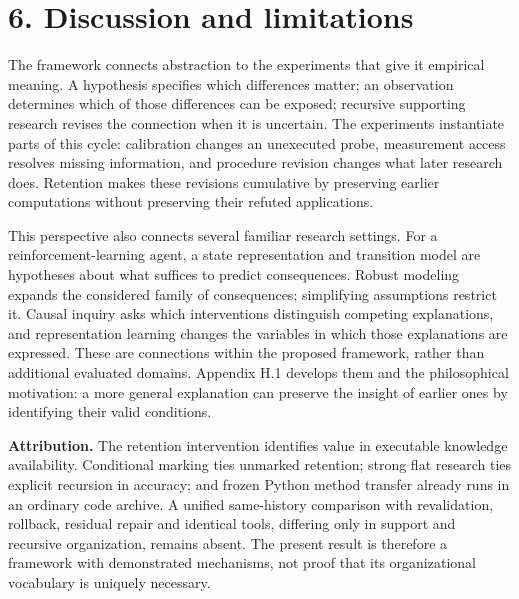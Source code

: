 \documentclass[11pt,a4paper]{article}
\begin{document}
\section*{6. Discussion and limitations}

The framework connects abstraction to the experiments that give it empirical meaning. A hypothesis specifies which differences matter; an observation determines which of those differences can be exposed; recursive supporting research revises the connection when it is uncertain. The experiments instantiate parts of this cycle: calibration changes an unexecuted probe, measurement access resolves missing information, and procedure revision changes what later research does. Retention makes these revisions cumulative by preserving earlier computations without preserving their refuted applications.


This perspective also connects several familiar research settings. For a reinforcement-learning agent, a state representation and transition model are hypotheses about what suffices to predict consequences. Robust modeling expands the considered family of consequences; simplifying assumptions restrict it. Causal inquiry asks which interventions distinguish competing explanations, and representation learning changes the variables in which those explanations are expressed. These are connections within the proposed framework, rather than additional evaluated domains. Appendix H.1 develops them and the philosophical motivation: a more general explanation can preserve the insight of earlier ones by identifying their valid conditions.


\textbf{Attribution.} The retention intervention identifies value in executable knowledge availability. Conditional marking ties unmarked retention; strong flat research ties explicit recursion in accuracy; and frozen Python method transfer already runs in an ordinary code archive. A unified same-history comparison with revalidation, rollback, residual repair and identical tools, differing only in support and recursive organization, remains absent. The present result is therefore a framework with demonstrated mechanisms, not proof that its organizational vocabulary is uniquely necessary.
\end{document}
